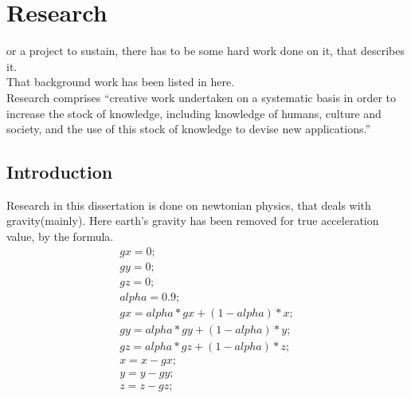 %
%
\let\textcircled=\pgftextcircled
\chapter{Research}
\label{chap:intro}

or a project to sustain, there has to be some hard work done on it, that describes it.\\
 That background work has been listed in here. \\
 Research comprises ``creative work undertaken on a systematic basis in order to increase the stock of knowledge, including knowledge of humans, culture and society, and the use of this stock of knowledge to devise new applications.''


\section{Introduction}
\label{sec:sec01}

Research in this dissertation is done on newtonian physics, that deals with gravity(mainly).
Here earth's gravity has been removed for true acceleration value, by the formula.
\begin{equation}
\begin{split}
gx=0; \\
gy=0; \\
gz=0; \\
alpha=0.9; \\
gx=alpha * gx + (1 - alpha) * x; \\
gy=alpha * gy + (1 - alpha) * y; \\
gz=alpha * gz + (1 - alpha) * z; \\
x=x-gx; \\
y=y-gy; \\
z=z-gz; 
\end{split}
\end{equation}

